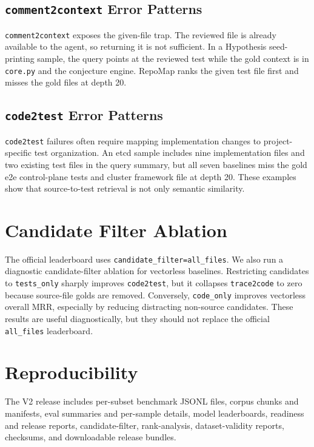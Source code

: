 \documentclass[11pt]{article}
\newcommand{\code}[1]{\texttt{#1}}
\begin{document}
\subsection{\code{comment2context} Error Patterns}

\code{comment2context} exposes the given-file trap. The reviewed file is already available to the agent, so returning it is not sufficient. In a Hypothesis seed-printing sample, the query points at the reviewed test while the gold context is in \code{core.py} and the conjecture engine. RepoMap ranks the given test file first and misses the gold files at depth 20.

\subsection{\code{code2test} Error Patterns}

\code{code2test} failures often require mapping implementation changes to project-specific test organization. An etcd sample includes nine implementation files and two existing test files in the query summary, but all seven baselines miss the gold e2e control-plane tests and cluster framework file at depth 20. These examples show that source-to-test retrieval is not only semantic similarity.

\section{Candidate Filter Ablation}

The official leaderboard uses \code{candidate\_filter=all\_files}. We also run a diagnostic candidate-filter ablation for vectorless baselines. Restricting candidates to \code{tests\_only} sharply improves \code{code2test}, but it collapses \code{trace2code} to zero because source-file golds are removed. Conversely, \code{code\_only} improves vectorless overall MRR, especially by reducing distracting non-source candidates. These results are useful diagnostically, but they should not replace the official \code{all\_files} leaderboard.

\section{Reproducibility}

The V2 release includes per-subset benchmark JSONL files, corpus chunks and manifests, eval summaries and per-sample details, model leaderboards, readiness and release reports, candidate-filter, rank-analysis, dataset-validity reports, checksums, and downloadable release bundles.
\end{document}
